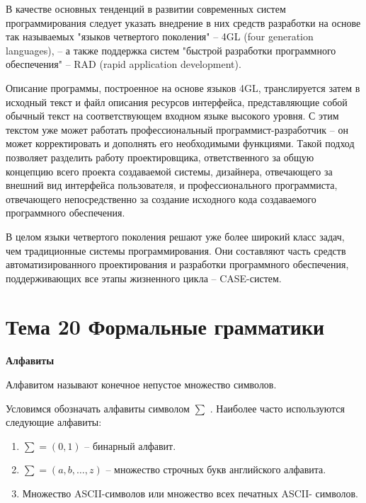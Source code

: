   В качестве основных тенденций в развитии современных систем программирования следует указать внедрение в них средств разработки на основе так называемых "языков четвертого поколения" -- 4GL (four generation languages), -- а также поддержка систем "быстрой разработки программного обеспечения" -- RAD (rapid application development).

  Описание программы, построенное на основе языков 4GL, транслируется затем в исходный текст и файл описания ресурсов интерфейса, представляющие собой обычный текст на соответствующем входном языке высокого уровня. С этим текстом уже может работать профессиональный программист-разработчик -- он может корректировать и дополнять его необходимыми функциями. Такой подход позволяет разделить работу проектировщика, ответственного за общую концепцию всего проекта создаваемой системы, дизайнера, отвечающего за внешний вид интерфейса пользователя, и профессионального программиста, отвечающего непосредственно за создание исходного кода создаваемого программного обеспечения.

  В целом языки четвертого поколения решают уже более широкий класс задач, чем традиционные системы программирования. Они составляют часть средств автоматизированного проектирования и разработки программного обеспечения, поддерживающих все этапы жизненного цикла -- CASE-систем.

  \newpage 
\chapter{Тема 20 Формальные грамматики}

\begin{center}{\bfseries Алфавиты}
\end{center}

\begin{opr}
  Алфавитом называют конечное непустое множество символов.
\end{opr}

Условимся обозначать алфавиты символом $\sum$ . Наиболее часто используются следующие алфавиты:

\begin{enumerate}
  \item $\sum = (0,1)$ – бинарный алфавит.
  \item $\sum = (a,b, …,z)$ – множество строчных букв английского алфавита.
  \item Множество ASCII-символов или множество всех печатных ASCII- символов.
\end{enumerate}

